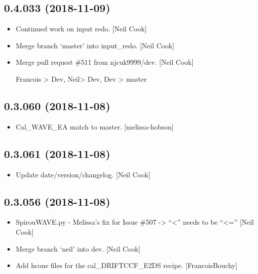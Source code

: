 \documentclass[a4paper,10pt,english]{report}
\begin{document}
\subsection{0.4.033 (2018-11-09)}
\label{\detokenize{misc/changelog:id261}}\begin{itemize}
\item {} 
Continued work on input redo. {[}Neil Cook{]}

\item {} 
Merge branch ‘master’ into input\_redo. {[}Neil Cook{]}

\item {} 
Merge pull request \#511 from njcuk9999/dev. {[}Neil Cook{]}

Francois \textendash{}\textgreater{} Dev, Neil\textendash{}\textgreater{} Dev, Dev \textendash{}\textgreater{} master

\end{itemize}


\subsection{0.3.060 (2018-11-08)}
\label{\detokenize{misc/changelog:id262}}\begin{itemize}
\item {} 
Cal\_WAVE\_EA match to master. {[}melissa-hobson{]}

\end{itemize}


\subsection{0.3.061 (2018-11-08)}
\label{\detokenize{misc/changelog:id263}}\begin{itemize}
\item {} 
Update date/version/changelog. {[}Neil Cook{]}

\end{itemize}


\subsection{0.3.056 (2018-11-08)}
\label{\detokenize{misc/changelog:id264}}\begin{itemize}
\item {} 
SpirouWAVE.py - Melissa’s fix for Issue \#507 -\textgreater{}   “\textless{}” needs to be “\textless{}=”
{[}Neil Cook{]}

\item {} 
Merge branch ‘neil’ into dev. {[}Neil Cook{]}

\item {} 
Add hcone files for the cal\_DRIFTCCF\_E2DS recipe. {[}FrancoisBouchy{]}

\end{itemize}
\end{document}
